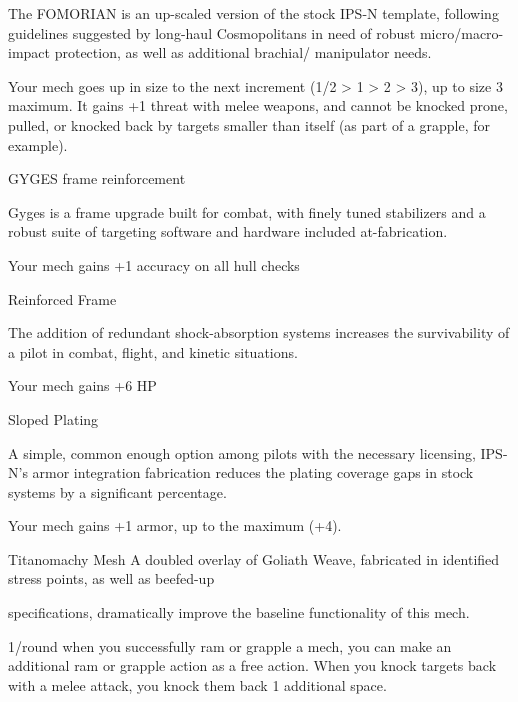 The FOMORIAN is an up-scaled version of the stock IPS-N template, following guidelines suggested by  
long-haul Cosmopolitans in need of robust micro/macro-impact protection, as well as additional brachial/ 
manipulator needs.  

Your mech goes up in size to the next increment (1/2 > 1 > 2 > 3), up to size 3 maximum. It gains  
+1 threat with melee weapons, and cannot be knocked prone, pulled, or knocked back by  
targets smaller than itself (as part of a grapple, for example).
 

GYGES frame reinforcement  

Gyges is a frame upgrade built for combat, with finely tuned stabilizers and a robust suite of targeting  
software and hardware included at-fabrication.   

Your mech gains +1 accuracy on all hull checks
 

Reinforced Frame  

The addition of redundant shock-absorption systems increases the survivability of a pilot in combat, flight,  
and kinetic situations.   

Your mech gains +6 HP
 

Sloped Plating  

A simple, common enough option among pilots with the necessary licensing, IPS-N’s armor integration  
fabrication reduces the plating coverage gaps in stock systems by a significant percentage.   

Your mech gains +1 armor, up to the maximum (+4).
 

                                                                                                                 


Titanomachy Mesh   
A doubled overlay of Goliath Weave, fabricated in identified stress points, as well as beefed-up  

specifications, dramatically improve the baseline functionality of this mech.   

1/round when you successfully ram or grapple a mech, you can make an additional ram or  
grapple action as a free action. When you knock targets back with a melee attack, you knock  
them back 1 additional space.
 

                                                                                                                     


                                                                                                                         


